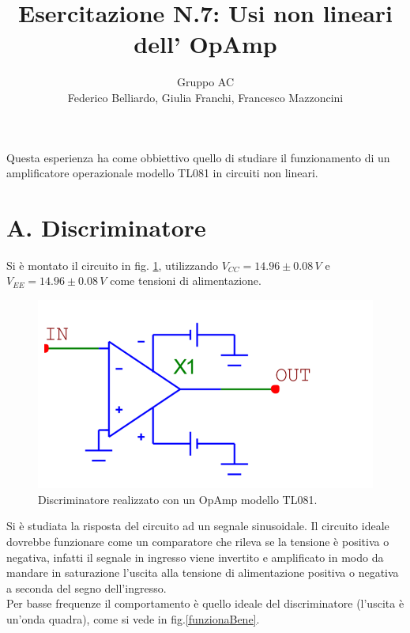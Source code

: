 \documentclass[10pt,a4paper]{article}
\author{Gruppo AC \\ Federico Belliardo, Giulia Franchi, Francesco Mazzoncini}
\title{Esercitazione N.7: Usi non lineari dell’ OpAmp}
\begin{document}
\maketitle
Questa esperienza ha come obbiettivo quello di studiare il funzionamento di un amplificatore operazionale modello TL081 in circuiti non lineari.

\section*{A. Discriminatore}

Si è montato il circuito in fig. \ref{circuito1}, utilizzando $V_{CC} = 14.96\pm0.08 \, V$ e $V_{EE} = 14.96 \pm 0.08 \, V$ come tensioni di alimentazione.

\begin{figure}[h]
\centering
\includegraphics[scale=0.5]{Discriminatore.png}
\caption{Discriminatore realizzato con un OpAmp modello TL081.}
\label{circuito1}
\end{figure}

Si è studiata la risposta del circuito ad un segnale sinusoidale. Il circuito ideale dovrebbe funzionare come un comparatore che rileva se la tensione è positiva o negativa, infatti il segnale in ingresso viene invertito e amplificato in modo da mandare in saturazione l'uscita alla tensione di alimentazione  positiva o negativa a seconda del segno dell'ingresso.\\
Per basse frequenze il comportamento è quello ideale del discriminatore (l'uscita è un'onda quadra), come si vede in fig.\ref{funzionaBene}.
\end{document}
